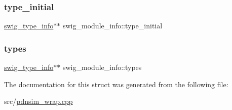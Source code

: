 \mbox{\label{structswig__module__info_a76c7d5b0fc10371748616d0b6c815a17}} 
\subsubsection{\texorpdfstring{type\+\_\+initial}{type\_initial}}
{\footnotesize\ttfamily \hyperlink{structswig__type__info}{swig\+\_\+type\+\_\+info}$\ast$$\ast$ swig\+\_\+module\+\_\+info\+::type\+\_\+initial}

\mbox{\label{structswig__module__info_ad658c7738e9a035ef8eea865322fbf13}} 
\subsubsection{\texorpdfstring{types}{types}}
{\footnotesize\ttfamily \hyperlink{structswig__type__info}{swig\+\_\+type\+\_\+info}$\ast$$\ast$ swig\+\_\+module\+\_\+info\+::types}



The documentation for this struct was generated from the following file\+:\begin{DoxyCompactItemize}
\item 
src/\hyperlink{pdnsim__wrap_8cpp}{pdnsim\+\_\+wrap.\+cpp}\end{DoxyCompactItemize}
